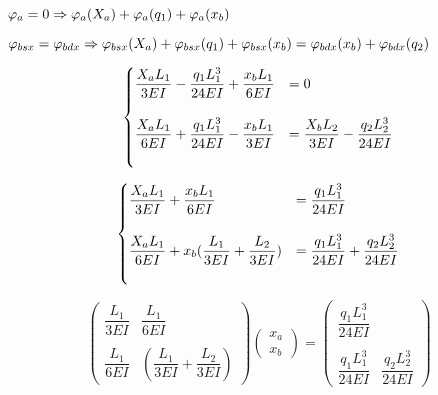 \documentclass[a4paper,12pt, oneside]{book}
\begin{document}
	\phantom{.}
	
	$ \varphi_a=0 \Rightarrow \varphi_a(X_a)+\varphi_a(q_1)+\varphi_a(x_b) \hfill$
	
	\phantom{.}
	
	$ \varphi_{bsx}=\varphi_{bdx} \Rightarrow \varphi_{bsx}(X_a)+\varphi_{bsx}(q_1)+\varphi_{bsx}(x_b)=\varphi_{bdx}(x_b)+\varphi_{bdx}(q_2) \hfill$
	
	\begin{equation}
		\centering
		\begin{cases}
			\dfrac{X_a L_1}{3EI}-\dfrac{q_1 L_1^{3}}{24EI}+\dfrac{x_b L_1}{6EI}&=0 \\ \\
			\dfrac{X_a L_1}{6EI}+\dfrac{q_1 L_1^{3}}{24EI}-\dfrac{x_b L_1}{3EI}&=\dfrac{X_b L_2}{3EI}-\dfrac{q_2 L_2^{3}}{24EI} \\ \\
		\end{cases}
	\end{equation}
	
	\begin{equation}
		\centering
		\begin{cases}
			\dfrac{X_a L_1}{3EI}+\dfrac{x_b L_1}{6EI}&=\dfrac{q_1 L_1^{3}}{24EI} \\ \\
			\dfrac{X_a L_1}{6EI}+x_b(\dfrac{L_1}{3EI}+\dfrac{L_2}{3EI})&=\dfrac{q_1 L_1^{3}}{24EI}+\dfrac{q_2 L_2^{3}}{24EI} \\ \\
		\end{cases}
	\end{equation}
	
	\begin{equation}
		\begin{pmatrix}
			\dfrac{L_1}{3EI} & \dfrac{L_1}{6EI}\\\\ \dfrac{L_1}{6EI} & (\dfrac{L_1}{3EI}+\dfrac{L_2}{3EI})
		\end{pmatrix}
		\begin{pmatrix}
			x_a \\ x_b
		\end{pmatrix}
		=
		\begin{pmatrix}
			\dfrac{q_1 L_1^{3}}{24EI} \\\\ \dfrac{q_1 L_1^{3}}{24EI} & \dfrac{q_2 L_2^{3}}{24EI}
		\end{pmatrix}
	\end{equation}	
	
\end{document}
